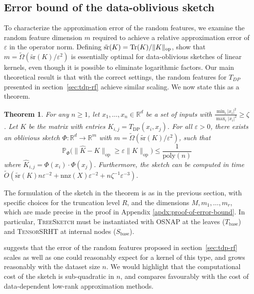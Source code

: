 \documentclass{article}
\theoremstyle{plain}
\newtheorem{theorem}{Theorem}[section]
\theoremstyle{definition}
\theoremstyle{remark}
\newcommand{\R}{\mathbb{R}}
\newcommand{\Tr}{\textnormal{Tr}}
\renewcommand{\Pr}{\mathbb{P}}
\begin{document}
\subsection{Error bound of the data-oblivious sketch}\label{sec:tdp-error-bound}

To characterize the approximation error of the random features,
we examine the random feature dimension $m$ required to achieve a
relative approximation error of $\varepsilon$ in the operator norm.
Defining $\tilde{\text{sr}}(K) = \Tr(K)/\|K\|_\text{op}$,
\citet{cohen2015optimal} show that $m=\tilde\Omega(\tilde{\text{sr}}(K)/\varepsilon^2)$
is essentially optimal for data-oblivious sketches of linear kernels, even though it is possible to eliminate logarithmic factors.
Our main theoretical result is that with the correct settings,
the random features for $T_{DP}$ presented in section~\ref{sec:tdp-rf} achieve similar scaling.
We now state this as a theorem.

\begin{theorem} \label{error bound theorem}
For any $n\ge 1$, let $x_1,\dots,x_n\in\R^d$ be a set of inputs with $\frac{\min_i |x_i|^2}{\max_i |x_i|^2} \geq \zeta$. Let $K$ be the matrix with entries $K_{i,j} = T_\text{DP}(x_i,x_j)$. For all $\varepsilon>0$, there exists an oblivious sketch $\Phi:\R^d \to \R^m$ with $m=\tilde\Omega(\tilde{\text{sr}}(K) /\varepsilon^{2})$, such that 
\begin{equation}
\Pr_{\Phi}\big(\|\widehat K-K\|_\text{op} \ge\varepsilon \|K\|_\text{op}\big) \leq \frac{1}{\text{poly}(n)}
\end{equation}
where $\widehat K_{i,j} = \Phi(x_i)\cdot \Phi(x_j)$. Furthermore, the sketch can be computed in time $\tilde O(\tilde{\text{sr}}(K)n\varepsilon^{-2}+\text{nnz}(X)\varepsilon^{-2}+n\zeta^{-1}\varepsilon^{-3})$.
\end{theorem}
The formulation of the sketch in the theorem is as in the previous section, with specific choices for the truncation level $R$, and the dimensions $M,m_1,\dots,m_r$, which are made precise in the proof in Appendix \ref{apdx:proof-of-error-bound}.
In particular, \textsc{TreeSketch} must be instantiated with \textsc{OSNAP} \citep{nelson2013osnap} at the leaves ($T_\text{base}$)  and \textsc{TensorSRHT} at internal nodes ($S_\text{base}$).

 suggests that the error of the random features proposed in section~\ref{sec:tdp-rf}
scales as well as one could reasonably expect for a kernel of this type,
and grows reasonably with the dataset size $n$.
We would highlight that the computational cost of the sketch is sub-quadratic in $n$, and compares favourably with the cost of data-dependent low-rank approximation methods.
\end{document}
